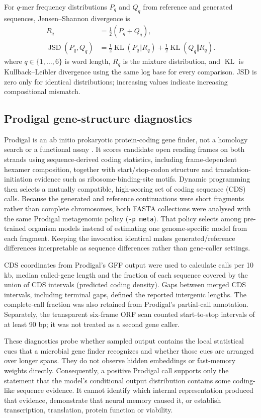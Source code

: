 \documentclass[10pt,twocolumn]{article}
\newcommand{\code}[1]{\texttt{#1}}
\begin{document}
For $q$-mer frequency distributions $P_q$ and $Q_q$ from reference and generated sequences, Jensen--Shannon divergence is
\begin{align}
R_q&=\tfrac12(P_q+Q_q),\nonumber\\
\operatorname{JSD}(P_q,Q_q)&=\tfrac12\operatorname{KL}(P_q\Vert R_q)
 +\tfrac12\operatorname{KL}(Q_q\Vert R_q).\label{eq:jsd}
\end{align}
where $q\in\{1,\ldots,6\}$ is word length, $R_q$ is the mixture distribution, and $\operatorname{KL}$ is Kullback--Leibler divergence using the same log base for every comparison. JSD is zero only for identical distributions; increasing values indicate increasing compositional mismatch.

\subsection*{Prodigal gene-structure diagnostics}
Prodigal is an ab initio prokaryotic protein-coding gene finder, not a homology search or a functional assay \cite{hyatt2010prodigal}. It scores candidate open reading frames on both strands using sequence-derived coding statistics, including frame-dependent hexamer composition, together with start/stop-codon structure and translation-initiation evidence such as ribosome-binding-site motifs. Dynamic programming then selects a mutually compatible, high-scoring set of coding sequence (CDS) calls. Because the generated and reference continuations were short fragments rather than complete chromosomes, both FASTA collections were analysed with the same Prodigal metagenomic policy (\code{-p meta}). That policy selects among pre-trained organism models instead of estimating one genome-specific model from each fragment. Keeping the invocation identical makes generated/reference differences interpretable as sequence differences rather than gene-caller settings.

CDS coordinates from Prodigal's GFF output were used to calculate calls per 10 kb, median called-gene length and the fraction of each sequence covered by the union of CDS intervals (predicted coding density). Gaps between merged CDS intervals, including terminal gaps, defined the reported intergenic lengths. The complete-call fraction was also retained from Prodigal's partial-call annotation. Separately, the transparent six-frame ORF scan counted start-to-stop intervals of at least 90 bp; it was not treated as a second gene caller.

These diagnostics probe whether sampled output contains the local statistical cues that a microbial gene finder recognizes and whether those cues are arranged over longer spans. They do not observe hidden embeddings or fast-memory weights directly. Consequently, a positive Prodigal call supports only the statement that the model's conditional output distribution contains some coding-like sequence evidence. It cannot identify which internal representation produced that evidence, demonstrate that neural memory caused it, or establish transcription, translation, protein function or viability.
\end{document}
